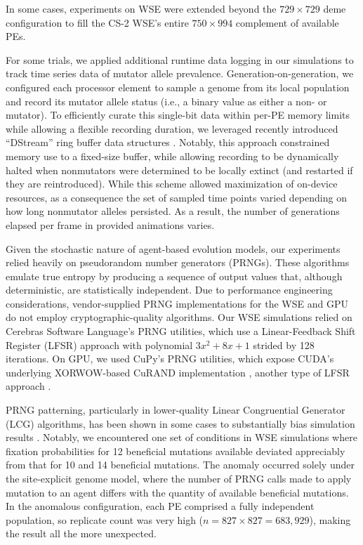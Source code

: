 In some cases, experiments on WSE were extended beyond the $729 \times 729$ deme configuration to fill the CS-2 WSE's entire $750 \times 994$ complement of available PEs.

For some trials, we applied additional runtime data logging in our simulations to track time series data of mutator allele prevalence.
Generation-on-generation, we configured each processor element to sample a genome from its local population and record its mutator allele status (i.e., a binary value as either a non- or mutator).
To efficiently curate this single-bit data within per-PE memory limits while allowing a flexible recording duration, we leveraged recently introduced ``DStream'' ring buffer data structures \cite{moreno2024algorithms}.
Notably, this approach constrained memory use to a fixed-size buffer, while allowing recording to be dynamically halted when nonmutators were determined to be locally extinct (and restarted if they are reintroduced).
While this scheme allowed maximization of on-device resources, as a consequence the set of sampled time points varied depending on how long nonmutator alleles persisted.
As a result, the number of generations elapsed per frame in provided animations varies. 

Given the stochastic nature of agent-based evolution models, our experiments relied heavily on pseudorandom number generators (PRNGs).
These algorithms emulate true entropy by producing a sequence of output values that, although deterministic, are statistically independent.
Due to performance engineering considerations, vendor-supplied PRNG implementations for the WSE and GPU do not employ cryptographic-quality algorithms.
Our WSE simulations relied on Cerebras Software Language's PRNG utilities, which use a Linear-Feedback Shift Register (LFSR) approach with polynomial $3x^2 + 8x + 1$ strided by 128 iterations.
On GPU, we used CuPy's PRNG utilities, which expose CUDA's underlying XORWOW-based CuRAND implementation \cite{marsaglia2003xorshift}, another type of LFSR approach \cite{brent2004note}.

PRNG patterning, particularly in lower-quality Linear Congruential Generator (LCG) algorithms, has been shown in some cases to substantially bias simulation results \cite{click2010quality}.
Notably, we encountered one set of conditions in WSE simulations where fixation probabilities for 12 beneficial mutations available deviated appreciably from that for 10 and 14 beneficial mutations.
The anomaly occurred solely under the site-explicit genome model, where the number of PRNG calls made to apply mutation to an agent differs with the quantity of available beneficial mutations.
In the anomalous configuration, each PE comprised a fully independent population, so replicate count was very high ($n = 827 \times 827 = 683,929$), making the result all the more unexpected.

